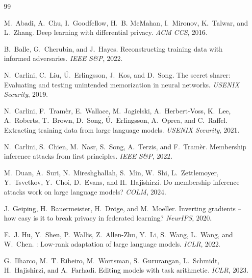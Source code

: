 \documentclass[11pt]{article}
\theoremstyle{plain}
\theoremstyle{definition}
\begin{document}

\begin{thebibliography}{99}
\small

M.~Abadi, A.~Chu, I.~Goodfellow, H.~B. McMahan, I.~Mironov, K.~Talwar, and L.~Zhang.
\newblock Deep learning with differential privacy. \emph{ACM CCS}, 2016.

B.~Balle, G.~Cherubin, and J.~Hayes.
\newblock Reconstructing training data with informed adversaries. \emph{IEEE S\&P}, 2022.

N.~Carlini, C.~Liu, {\'U}.~Erlingsson, J.~Kos, and D.~Song.
\newblock The secret sharer: Evaluating and testing unintended memorization in neural networks. \emph{USENIX Security}, 2019.

N.~Carlini, F.~Tram{\`e}r, E.~Wallace, M.~Jagielski, A.~Herbert-Voss, K.~Lee, A.~Roberts, T.~Brown, D.~Song, {\'U}.~Erlingsson, A.~Oprea, and C.~Raffel.
\newblock Extracting training data from large language models. \emph{USENIX Security}, 2021.

N.~Carlini, S.~Chien, M.~Nasr, S.~Song, A.~Terzis, and F.~Tram{\`e}r.
\newblock Membership inference attacks from first principles. \emph{IEEE S\&P}, 2022.

M.~Duan, A.~Suri, N.~Mireshghallah, S.~Min, W.~Shi, L.~Zettlemoyer, Y.~Tsvetkov, Y.~Choi, D.~Evans, and H.~Hajishirzi.
\newblock Do membership inference attacks work on large language models? \emph{COLM}, 2024.

J.~Geiping, H.~Bauermeister, H.~Dr{\"o}ge, and M.~Moeller.
\newblock Inverting gradients -- how easy is it to break privacy in federated learning? \emph{NeurIPS}, 2020.

E.~J. Hu, Y.~Shen, P.~Wallis, Z.~Allen-Zhu, Y.~Li, S.~Wang, L.~Wang, and W.~Chen.
: Low-rank adaptation of large language models. \emph{ICLR}, 2022.

G.~Ilharco, M.~T. Ribeiro, M.~Wortsman, S.~Gururangan, L.~Schmidt, H.~Hajishirzi, and A.~Farhadi.
\newblock Editing models with task arithmetic. \emph{ICLR}, 2023.


\end{thebibliography}
\end{document}
